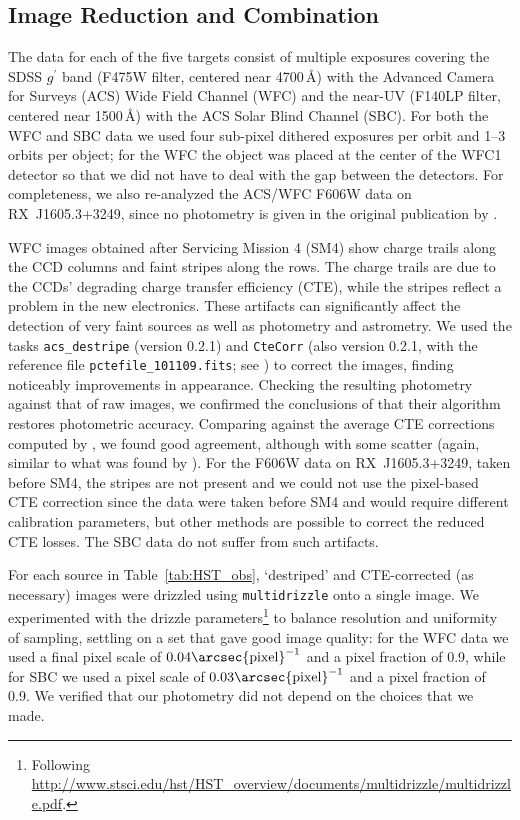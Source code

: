 \documentclass[iop]{emulateapj}
\newcommand{\rxjvk}{RX~J1605.3+3249}
\begin{document}
\subsection{Image Reduction and Combination}
The data for each of the five targets consist of multiple exposures
covering the SDSS $g^\prime$ band (F475W filter, centered near
4700\,\AA) with the Advanced Camera for Surveys (ACS) Wide Field
Channel (WFC) and the near-UV (F140LP filter, centered near 1500\,\AA)
with the ACS Solar Blind Channel (SBC).  For both the WFC and SBC data
we used four sub-pixel dithered exposures per orbit and 1--3 orbits
per object; for the WFC the object was placed at the center of the
WFC1 detector so that we did not have to deal with the gap between the
detectors.  For completeness, we also re-analyzed the ACS/WFC F606W
data on \rxjvk, since no photometry is given in the original
publication by \citet{zdlmt06}.

WFC images obtained after Servicing Mission 4 (SM4) show charge trails
along the CCD columns and faint stripes along the rows.  The charge
trails are due to the CCDs' degrading charge transfer efficiency
(CTE), while the stripes reflect a problem in the new electronics.
These artifacts can significantly affect the detection of very faint
sources as well as photometry and astrometry.  We used the tasks
\texttt{acs\_destripe} (version 0.2.1) and \texttt{CteCorr} (also
version 0.2.1, with the reference file \texttt{pctefile\_101109.fits};
see \citealt{ab10}) to correct the images, finding noticeably
improvements in appearance.  Checking the resulting photometry against
that of raw images, we confirmed the conclusions of \citet{ab10} that
their algorithm restores photometric accuracy.  Comparing against the
average CTE corrections computed by \citet{clkp+09}, we found good
agreement, although with some scatter (again, similar to what was
found by \citealt{ab10}).  For the F606W data on \rxjvk, taken before
SM4, the stripes are not present and we could not use the pixel-based
CTE correction since the data were taken before SM4 and would require
different calibration parameters, but other methods are possible to
correct the reduced CTE losses.  The SBC data do not suffer from such
artifacts.

For each source in Table~\ref{tab:HST_obs}, `destriped' and
CTE-corrected (as necessary) images were drizzled using
\texttt{multidrizzle} \citep{kfhh02} onto a single image. We
experimented with the drizzle parameters\footnote{Following
  \url{http://www.stsci.edu/hst/HST\_overview/documents/multidrizzle/multidrizzle.pdf}.}
to balance resolution and uniformity of sampling, settling on a set
that gave good image quality: for the WFC data we used a final pixel
scale of $0.04\arcsec {\rm pixel}^{-1}$ and a pixel fraction of 0.9,
while for SBC we used a pixel scale of $0.03\arcsec {\rm pixel}^{-1}$
and a pixel fraction of 0.9.  We verified that our photometry did not
depend on the choices that we made.
\end{document}
